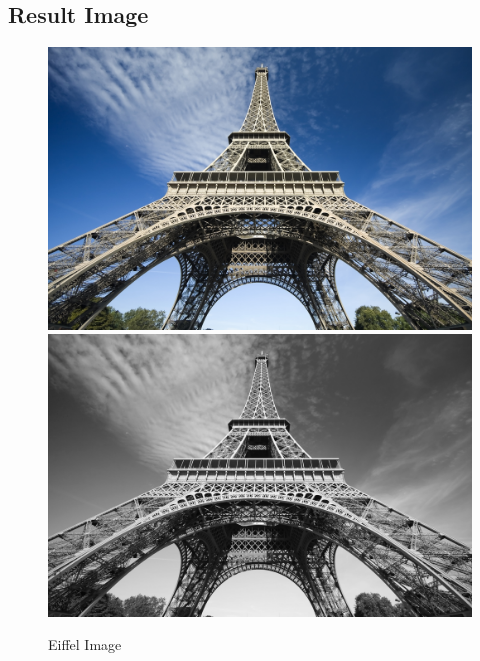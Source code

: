 \documentclass{article}
\begin{document}
\subsection{Result Image}
\begin{figure}
        \includegraphics[width=\textwidth]{./labwork/data/eiffel.jpg}
        \includegraphics[width=\textwidth]{./labwork3-gpu-out.jpg}
        \caption{Eiffel Image}
\end{figure}
\end{document}
